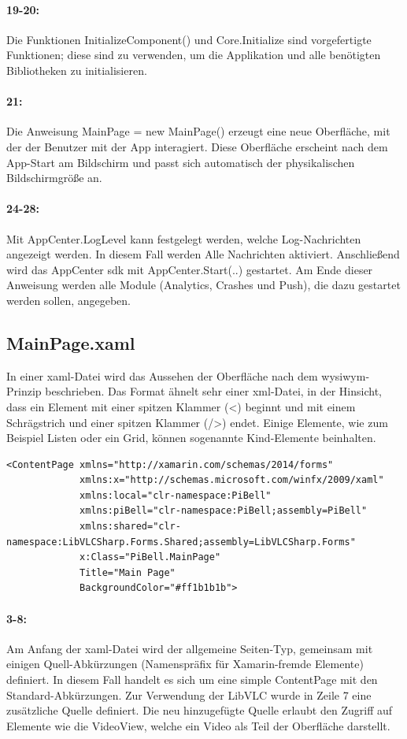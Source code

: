 \paragraph{19-20:} Die Funktionen InitializeComponent() und Core.Initialize sind vorgefertigte Funktionen; diese sind zu verwenden, um die Applikation und alle benötigten Bibliotheken zu initialisieren.
\paragraph{21:} Die Anweisung MainPage = new MainPage() erzeugt eine neue Oberfläche, mit der der Benutzer mit der App interagiert. Diese Oberfläche erscheint nach dem App-Start am Bildschirm und passt sich automatisch der physikalischen Bildschirmgröße an.
\paragraph{24-28:} Mit AppCenter.LogLevel kann festgelegt werden, welche Log-Nachrichten angezeigt werden. In diesem Fall werden Alle Nachrichten aktiviert.
Anschließend wird das AppCenter \ac{sdk} mit AppCenter.Start(..) gestartet. Am Ende dieser Anweisung werden alle Module (Analytics, Crashes und Push), die dazu gestartet werden sollen, angegeben.

\subsection{MainPage.xaml}
In einer \ac{xaml}-Datei wird das Aussehen der Oberfläche nach dem \ac{wysiwym}-Prinzip beschrieben. Das Format ähnelt sehr einer \ac{xml}-Datei, in der Hinsicht, dass ein Element mit einer spitzen Klammer (<) beginnt und mit einem Schrägstrich und einer spitzen Klammer (/>) endet. Einige Elemente, wie zum Beispiel Listen oder ein Grid, können sogenannte Kind-Elemente beinhalten.
\begin{verbatim}
<ContentPage xmlns="http://xamarin.com/schemas/2014/forms"
             xmlns:x="http://schemas.microsoft.com/winfx/2009/xaml"
             xmlns:local="clr-namespace:PiBell"
             xmlns:piBell="clr-namespace:PiBell;assembly=PiBell"
             xmlns:shared="clr-namespace:LibVLCSharp.Forms.Shared;assembly=LibVLCSharp.Forms"
             x:Class="PiBell.MainPage"
             Title="Main Page"
             BackgroundColor="#ff1b1b1b">
\end{verbatim}
\paragraph{3-8:} Am Anfang der \ac{xaml}-Datei wird der allgemeine Seiten-Typ, gemeinsam mit einigen Quell-Abkürzungen (Namenspräfix für Xamarin-fremde Elemente) definiert. In diesem Fall handelt es sich um eine simple ContentPage mit den Standard-Abkürzungen. Zur Verwendung der LibVLC wurde in Zeile 7 eine zusätzliche Quelle definiert. Die neu hinzugefügte Quelle erlaubt den Zugriff auf Elemente wie die VideoView, welche ein Video als Teil der Oberfläche darstellt.
